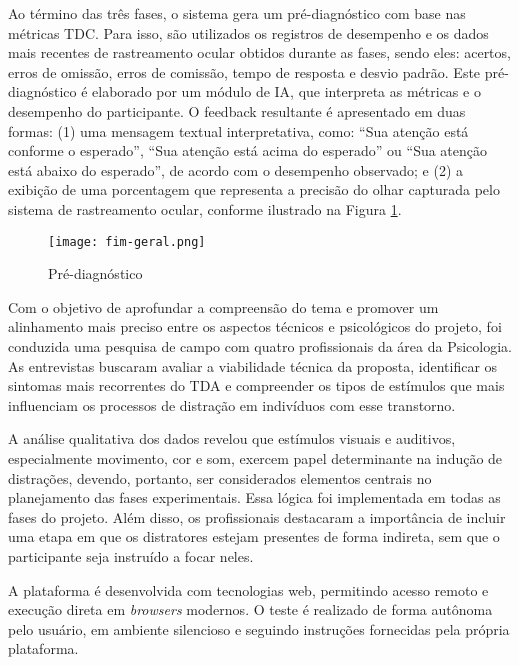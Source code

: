 Ao término das três fases, o sistema gera um pré-diagnóstico com base nas métricas TDC. Para isso, são utilizados os registros de desempenho e os dados mais recentes de rastreamento ocular obtidos durante as fases, sendo eles: acertos, erros de omissão, erros de comissão, tempo de resposta e desvio padrão. Este pré-diagnóstico é elaborado por um módulo de IA, que interpreta as métricas e o desempenho do participante. O feedback resultante é apresentado em duas formas: (1) uma mensagem textual interpretativa, como: “Sua atenção está conforme o esperado”, “Sua atenção está acima do esperado” ou “Sua atenção está abaixo do esperado”, de acordo com o desempenho observado; e (2) a exibição de uma porcentagem que representa a precisão do olhar capturada pelo sistema de rastreamento ocular, conforme ilustrado na Figura \ref{fig:fim-geral}.

\begin{figure}[H]
    \centering
    \caption{Pré-diagnóstico}%
    \label{fig:fim-geral}
    \texttt{[image: fim-geral.png]}%
\end{figure}

Com o objetivo de aprofundar a compreensão do tema e promover um alinhamento mais preciso entre os aspectos técnicos e psicológicos do projeto, foi conduzida uma pesquisa de campo com quatro profissionais da área da Psicologia. As entrevistas buscaram avaliar a viabilidade técnica da proposta, identificar os sintomas mais recorrentes do TDA e compreender os tipos de estímulos que mais influenciam os processos de distração em indivíduos com esse transtorno.

A análise qualitativa dos dados revelou que estímulos visuais e auditivos, especialmente movimento, cor e som, exercem papel determinante na indução de distrações, devendo, portanto, ser considerados elementos centrais no planejamento das fases experimentais. Essa lógica foi implementada em todas as fases do projeto.
Além disso, os profissionais destacaram a importância de incluir uma etapa em que os distratores estejam presentes de forma indireta, sem que o participante seja instruído a focar neles.

A plataforma é desenvolvida com tecnologias web, permitindo acesso remoto e execução
direta em \textit{browsers} modernos. O teste é realizado de forma autônoma pelo usuário, em ambiente silencioso e seguindo instruções fornecidas pela própria plataforma.

